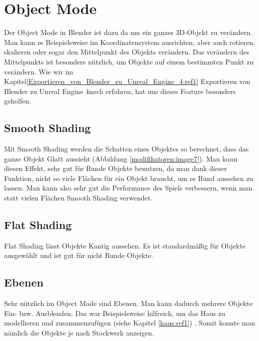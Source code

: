 \section{Object Mode}
Der Object Mode in Blender ist dazu da um ein ganzes 3D-Objekt zu verändern. Man kann es Beispielsweise im Koordinatensystem ausrichten, aber
auch rotieren, skalieren oder sogar den Mittelpunkt des Objekts verändern. Das verändern des Mittelpunkts ist besonders nützlich, um Objekte auf
einem bestimmten Punkt zu verändern. Wie wir im Kapitel\autoref{Exportieren_von_Blender_zu_Unreal_Engine_4:ref1} \dq Exportieren von Blender zu Unreal Engine 4\dq noch erfahren, hat uns dieses Feature besonders geholfen.

\subsection{Smooth Shading}
\label{objectMode:smoothshading}
Mit Smooth Shading werden die Schatten eines Objektes so berechnet, dass das ganze Objekt Glatt aussieht (Abbildung \ref{modifikatoren:image7}).
Man kann diesen Effekt, sehr gut für Runde Objekte benutzen, da man dank dieser Funktion, nicht so viele Flächen für ein Objekt braucht, um
es Rund aussehen zu lassen. Man kann also sehr gut die Performance des Spiels verbessern, wenn man statt vielen Flächen Smooth Shading verwendet.

\subsection{Flat Shading}
Flat Shading lässt Objekte Kantig aussehen. Es ist standardmäßig für Objekte ausgewählt und ist gut für nicht Runde Objekte.

\subsection{Ebenen}
Sehr nützlich im Object Mode sind Ebenen. Man kann dadurch mehrere Objekte Ein- bzw. Ausblenden.
Das war Beispielsweise hilfreich, um das Haus zu modellieren und zusammenzufügen (siehe Kapitel \ref{haus:ref1}) .
Somit konnte man nämlich die Objekte je nach Stockwerk anzeigen.
